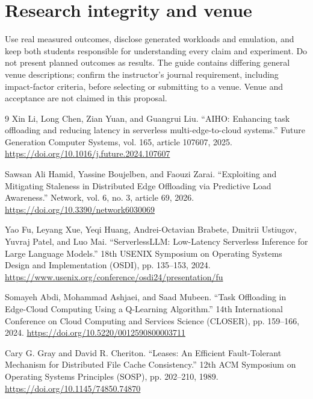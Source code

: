 \documentclass[11pt,a4paper]{article}
\begin{document}
\section{Research integrity and venue}
Use real measured outcomes, disclose generated workloads and emulation, and keep both students responsible for understanding every claim and experiment. Do not present planned outcomes as results. The guide contains differing general venue descriptions; confirm the instructor's journal requirement, including impact-factor criteria, before selecting or submitting to a venue. Venue and acceptance are not claimed in this proposal.
\begin{thebibliography}{9}
 Xin Li, Long Chen, Zian Yuan, and Guangrui Liu. ``AIHO: Enhancing task offloading and reducing latency in serverless multi-edge-to-cloud systems.'' Future Generation Computer Systems, vol. 165, article 107607, 2025. \url{https://doi.org/10.1016/j.future.2024.107607}

 Sawsan Ali Hamid, Yassine Boujelben, and Faouzi Zarai. ``Exploiting and Mitigating Staleness in Distributed Edge Offloading via Predictive Load Awareness.'' Network, vol. 6, no. 3, article 69, 2026. \url{https://doi.org/10.3390/network6030069}

 Yao Fu, Leyang Xue, Yeqi Huang, Andrei-Octavian Brabete, Dmitrii Ustiugov, Yuvraj Patel, and Luo Mai. ``ServerlessLLM: Low-Latency Serverless Inference for Large Language Models.'' 18th USENIX Symposium on Operating Systems Design and Implementation (OSDI), pp. 135--153, 2024. \url{https://www.usenix.org/conference/osdi24/presentation/fu}

 Somayeh Abdi, Mohammad Ashjaei, and Saad Mubeen. ``Task Offloading in Edge-Cloud Computing Using a Q-Learning Algorithm.'' 14th International Conference on Cloud Computing and Services Science (CLOSER), pp. 159--166, 2024. \url{https://doi.org/10.5220/0012590800003711}

 Cary G. Gray and David R. Cheriton. ``Leases: An Efficient Fault-Tolerant Mechanism for Distributed File Cache Consistency.'' 12th ACM Symposium on Operating Systems Principles (SOSP), pp. 202--210, 1989. \url{https://doi.org/10.1145/74850.74870}
\end{thebibliography}
\end{document}
